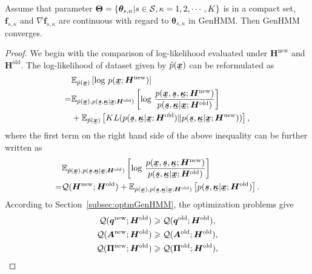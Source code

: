 \begin{proposition}\label{proposition1}
  Assume that parameter $\bm{\Theta} = \left\{ \bm{\theta}_{s,\kappa}| s\in \mathcal{S}, \kappa=1, 2, \cdots, K \right\}$ is in a compact set,  $\bm{f}_{s,\kappa}$ and  ${\nabla\bm{f}_{s,\kappa}}$ are continuous with regard to ${\bm\theta}_{s,\kappa}$ in GenHMM. Then GenHMM converges.
\end{proposition}

\begin{proof}
  We begin with the comparison of log-likelihood evaluated under $\bm{H}^{\mathrm{new}}$ and $\bm{H}^{\mathrm{old}}$. The log-likelihood of dataset given by $\hat{p}(\ubm{x})$ can be reformulated as
  \begin{align*}
    &\EE_{\hat{p}(\ubm{x})}\left[ \log\,p(\ubm{x};\bm{H}^{\mathrm{new}}) \right] \nonumber \\
    =& \EE_{\hat{p}(\ubm{x}),p(\ubm{s},\ubm{\kappa}| \ubm{x}; \bm{H}^{\mathrm{old}})}\left[ \log\,\frac{p(\ubm{x}, \ubm{s}, \ubm{\kappa}; \bm{H}^{\mathrm{new}})}{p(\ubm{s}, \ubm{\kappa}|\ubm{x}; \bm{H}^{\mathrm{old}})}\right]  \nonumber \\
    & +\EE_{\hat{p}(\ubm{x})}\left[ KL(p(\ubm{s}, \ubm{\kappa}|\ubm{x}; \bm{H}^{\mathrm{old}})\|p(\ubm{s}, \ubm{\kappa}|\ubm{x}; \bm{H}^{\mathrm{new}})) \right],
  \end{align*}
  where the first term on the right hand side of the above inequality can be further written as
  \begin{align*}
    &\EE_{\hat{p}(\ubm{x}),p(\ubm{s},\ubm{\kappa}| \ubm{x}; \bm{H}^{\mathrm{old}})}\left[ \log\,\frac{p(\ubm{x}, \ubm{s}, \ubm{\kappa}; \bm{H}^{\mathrm{new}})}{p(\ubm{s}, \ubm{\kappa}|\ubm{x}; \bm{H}^{\mathrm{old}})}\right] \nonumber \\
    = &\Qq(\bm{H}^{\mathrm{new}}; \bm{H}^{\mathrm{old}}) + \EE_{\hat{p}(\ubm{x}),p(\ubm{s},\ubm{\kappa}| \ubm{x}; \bm{H}^{\mathrm{old}})}\left[p(\ubm{s}, \ubm{\kappa}|\ubm{x}; \bm{H}^{\mathrm{old}})\right].
  \end{align*}
  According to Section~\ref{subsec:optmGenHMM}, the optimization problems give
  \begin{align*}
    \Qq(\bm{q}^{\mathrm{new}}; \bm{H}^{\mathrm{old}}) &\geq \Qq(\bm{q}^{\mathrm{old}}; \bm{H}^{\mathrm{old}}),\nonumber \\
    \Qq(\bm{A}^{\mathrm{new}}; \bm{H}^{\mathrm{old}}) &\geq \Qq(\bm{A}^{\mathrm{old}}; \bm{H}^{\mathrm{old}}),\nonumber \\
    \Qq(\bm{\Pi}^{\mathrm{new}}; \bm{H}^{\mathrm{old}}) &\geq \Qq(\bm{\Pi}^{\mathrm{old}}; \bm{H}^{\mathrm{old}}), \nonumber \\

\end{align*}
\end{proof}
